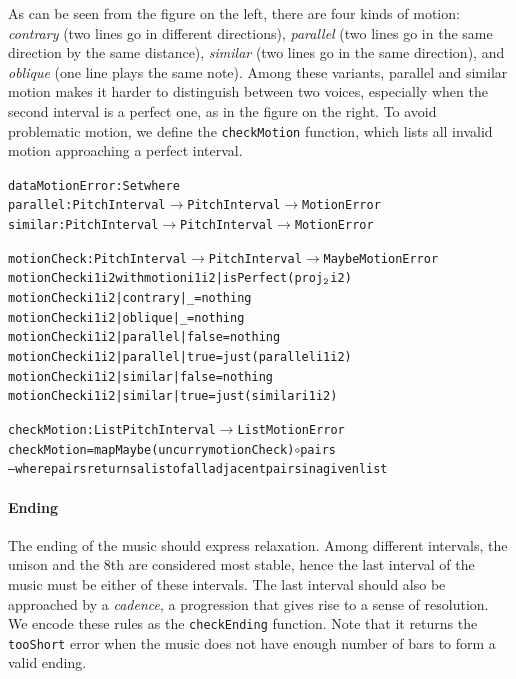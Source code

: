 As can be seen from the figure on the left, there are four kinds of
motion: \emph{contrary} (two lines go in different directions),
\emph{parallel} (two lines go in the same direction by the same
distance), \emph{similar} (two lines go in the same direction),
and \emph{oblique} (one line plays the same note).
Among these variants, parallel and similar motion makes it harder
to distinguish between two voices, especially when the second
interval is a perfect one, as in the figure on the right.
To avoid problematic motion, we define the \texttt{checkMotion}
function, which lists all invalid motion approaching a perfect interval.

\begin{alltt}
data MotionError : Set where
  parallel : PitchInterval \(\rightarrow\) PitchInterval \(\rightarrow\) MotionError
  similar  : PitchInterval \(\rightarrow\) PitchInterval \(\rightarrow\) MotionError

motionCheck : PitchInterval \(\rightarrow\) PitchInterval \(\rightarrow\) Maybe MotionError
motionCheck i1 i2 with motion i1 i2 | isPerfect (proj\(\sb{\mathtt{2}}\) i2)
motionCheck i1 i2 | contrary | \_     = nothing
motionCheck i1 i2 | oblique  | \_     = nothing
motionCheck i1 i2 | parallel | false = nothing
motionCheck i1 i2 | parallel | true  = just (parallel i1 i2)
motionCheck i1 i2 | similar  | false = nothing
motionCheck i1 i2 | similar  | true  = just (similar i1 i2)

checkMotion : List PitchInterval \(\rightarrow\) List MotionError
checkMotion = mapMaybe (uncurry motionCheck) \(\circ\) pairs
-- where pairs returns a list of all adjacent pairs in a given list
\end{alltt}

\paragraph{Ending}

The ending of the music should express relaxation.
Among different intervals, the unison and the 8th are considered
most stable, hence the last interval of the music must be either of
these intervals.
The last interval should also be approached by a \emph{cadence},
a progression that gives rise to a sense of resolution.
We encode these rules as the \texttt{checkEnding} function.
Note that it returns the \texttt{tooShort} error when the music does
not have enough number of bars to form a valid ending.

